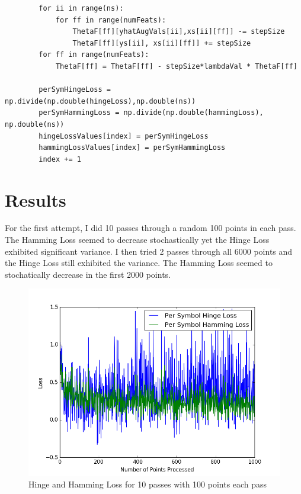 \documentclass[twoside,11pt]{article}
\theoremstyle{definition}
\begin{document}
\begin{lstlisting}
        for ii in range(ns):
            for ff in range(numFeats):
                ThetaF[ff][yhatAugVals[ii],xs[ii][ff]] -= stepSize
                ThetaF[ff][ys[ii], xs[ii][ff]] += stepSize
        for ff in range(numFeats):
            ThetaF[ff] = ThetaF[ff] - stepSize*lambdaVal * ThetaF[ff]

        perSymHingeLoss = np.divide(np.double(hingeLoss),np.double(ns))
        perSymHammingLoss = np.divide(np.double(hammingLoss), np.double(ns))
        hingeLossValues[index] = perSymHingeLoss
        hammingLossValues[index] = perSymHammingLoss
        index += 1

\end{lstlisting}

\newpage

\section*{Results}

For the first attempt, I did 10 passes through a random 100 points in each pass. The Hamming Loss seemed to decrease stochastically yet the Hinge Loss exhibited significant variance. I then tried 2 passes through all 6000 points and the Hinge Loss still exhibited the variance. The Hamming Loss seemed to stochatically decrease in the first 2000 points.

\begin{figure}[h]
\centering
\includegraphics[width=5in]{hingeHammingLoss1.png}
\caption{Hinge and Hamming Loss for 10 passes with 100 points each pass}
\end{figure}
\end{document}
